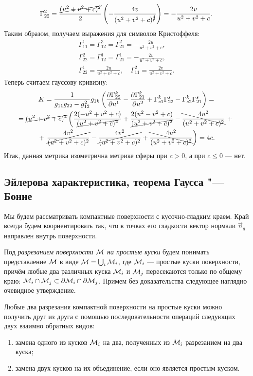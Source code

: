 \begin{solution}
\begin{gather*}
		\Gamma_{22}^2 = \frac{\cancel{(u^2 + v^2 + c)^2}}{2}\left(-\frac{4v}{(u^2 + v^2 + c)^{\cancel{3}}}\right) = -\frac{2v}{u^2 + v^2 + c}.
	\end{gather*}
	Таким образом, получаем выражения для символов Кристоффеля:
	\begin{gather*}
		\Gamma_{11}^1 = \Gamma_{12}^2 = \Gamma_{21}^2 = -\frac{2u}{u^2 + v^2 + c},\\
		\Gamma_{22}^2 = \Gamma_{12}^1 = \Gamma_{21}^1 = -\frac{2v}{u^2 + v^2 + c},\\
		\Gamma_{22}^1 = \frac{2u}{u^2 + v^2 + c},\quad
		\Gamma_{11}^2 = \frac{2v}{u^2 + v^2 + c}.
	\end{gather*}
	Теперь считаем гауссову кривизну:
	\begin{multline*}
		K = \frac{1}{g_{11}g_{22} - g_{12}^2}g_{1k}\left(\frac{\partial\Gamma^k_{22}}{\partial u^1} - \frac{\partial\Gamma_{21}^k}{\partial u^2} + \Gamma_{s1}^k\Gamma^s_{22} - \Gamma_{s2}^k\Gamma_{21}^s\right) =\\ = \cancel{(u^2 + v^2 + c)^2}\left(\frac{2(-u^2 + v^2 + c)}{\cancel{(u^2 + v^2 + c)^2}} + \frac{2(u^2 - v^2 + c)}{\cancel{(u^2 + v^2 + c)^2}} - \bcancel{\frac{4u^2}{(u^2 + v^2 + c)^2}}\right. + {}\\{} + \left.\cancel{\frac{4v^2}{(u^2 + v^2 + c)^2}} - \cancel{\frac{4v^2}{(u^2 + v^2 + c)^2}} + \bcancel{\frac{4u^2}{(u^2 + v^2 + c)^2}}\right) = 4c.
	\end{multline*}
	Итак, данная метрика изометрична метрике сферы при $c > 0$, а при $c \leqslant 0$ --- нет.
\end{solution}

\subsection{Эйлерова характеристика, теорема Гаусса "---Бонне}

Мы будем рассматривать компактные поверхности с кусочно-гладким краем. Край всегда будем коориентировать так, что в точках его гладкости вектор нормали $\vec{n}_g$ направлен внутрь поверхности.

Под \textit{разрезанием поверхности $\mathcal{M}$ на простые куски} будем понимать представление $\mathcal{M}$ в виде
$\mathcal{M} = \bigcup_i\mathcal{M}_i$, где $\mathcal{M}_i$ --- простые куски поверхности, причём любые два различных куска $\mathcal{M}_i$ и $\mathcal{M}_j$ пересекаются только по общему краю: $\mathcal{M}_i \cap \mathcal{M}_j \subset \partial\mathcal{M}_i \cap \partial\mathcal{M}_j$. Примем без доказательства следующее наглядно очевидное утверждение.

\begin{proposition} \label{proposition:Anycut}
	Любые два разрезания компактной поверхности на простые куски можно получить друг из друга с помощью последовательности операций следующих двух взаимно обратных видов:
	\begin{enumerate}[nolistsep, label=(\arabic*)]
		\item замена одного из кусков $\mathcal{M}_i$ на два, полученных из $\mathcal{M}_i$ разрезанием на два куска;
		\item замена двух кусков на их объединение, если оно является простым куском.
	\end{enumerate}
\end{proposition}

